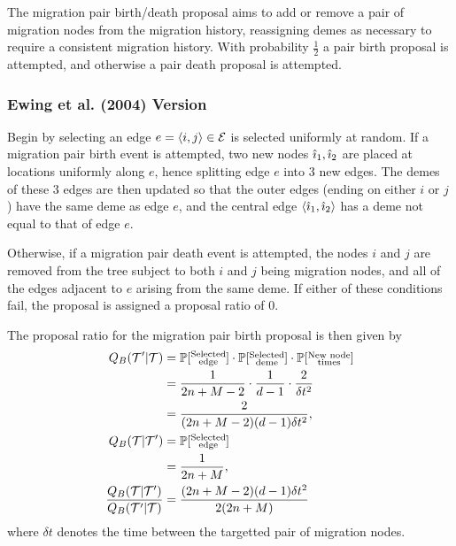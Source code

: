 The migration pair birth/death proposal aims to add or remove a pair of migration nodes from the migration history, reassigning demes as necessary to require a consistent migration history. With probability $\frac{1}{2}$ a pair birth proposal is attempted, and otherwise a pair death proposal is attempted.

\subsubsection{Ewing et al. (2004) Version}
	Begin by selecting an edge $e = \langle i,j \rangle \in \mathcal{E}$ is selected uniformly at random. If a migration pair birth event is attempted, two new nodes $\hat{\imath}_1, \hat{\imath}_2$ are placed at locations uniformly along $e$, hence splitting edge $e$ into 3 new edges. The demes of these 3 edges are then updated so that the outer edges (ending on either $i$ or $j$) have the same deme as edge $e$, and the central edge $\langle \hat{\imath}_1, \hat{\imath}_2 \rangle$ has a deme not equal to that of edge $e$.
	
	Otherwise, if a migration pair death event is attempted, the nodes $i$ and $j$ are removed from the tree subject to both $i$ and $j$ being migration nodes, and all of the edges adjacent to $e$ arising from the same deme. If either of these conditions fail, the proposal is assigned a proposal ratio of 0.
	
	The proposal ratio for the migration pair birth proposal is then given by
		\begin{align*}
			Q_B(\mathcal{T}' | \mathcal{T}) & = \mathbb{P} [\substack{\text{Selected} \\ \text{edge}}] \cdot \mathbb{P} [\substack{\text{Selected} \\ \text{deme}}] \cdot \mathbb{P} [\substack{\text{New node} \\ \text{times}}] \\
			& = \frac{1}{2n + M - 2} \cdot \frac{1}{d-1} \cdot \frac{2}{\delta t^2} \\
			& = \frac{2}{(2n + M - 2) (d-1) \delta t^2}, \\
			Q_B (\mathcal{T} | \mathcal{T}') & = \mathbb{P} [ \substack{\text{Selected} \\ \text{edge}}] \\
			& = \frac{1}{2n + M}, \\
			\frac{Q_B (\mathcal{T} | \mathcal{T}')}{Q_B (\mathcal{T}' | \mathcal{T})} & = \frac{(2n + M - 2) (d-1) \delta t^2}{2(2n + M)}
		\end{align*}
	where $\delta t$ denotes the time between the targetted pair of migration nodes.
	
